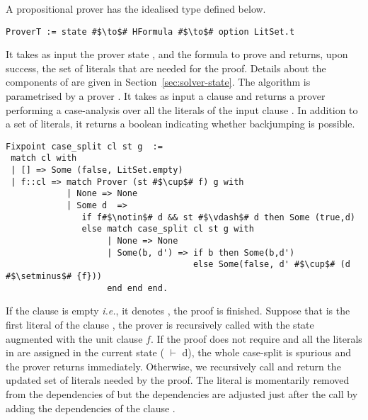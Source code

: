 \documentclass[utf8,a4paper,UKenglish,cleveref, autoref, thm-restate]{lipics-v2021}
\begin{document}
%
A propositional prover has the idealised type  defined below.
\begin{verbatim}
ProverT := state #$\to$# HFormula #$\to$# option LitSet.t
\end{verbatim}
It takes as input the prover state , and the formula
to prove  and returns, upon success, %
the set of literals that are needed for the proof.
%
Details about the components of  are given in Section~\ref{sec:solver-state}.
%
The  algorithm is parametrised by a prover .
It takes as input a clause  and returns a prover performing a case-analysis over all the
literals of the input clause . In addition to a set of
literals, it returns a boolean indicating whether backjumping is
possible.
\begin{verbatim}
Fixpoint case_split cl st g  :=
 match cl with
 | [] => Some (false, LitSet.empty)
 | f::cl => match Prover (st #$\cup$# f) g with
            | None => None
            | Some d  =>
               if f#$\notin$# d && st #$\vdash$# d then Some (true,d)
               else match case_split cl st g with
                    | None => None
                    | Some(b, d') => if b then Some(b,d')
                                     else Some(false, d' #$\cup$# (d #$\setminus$# {f}))
                    end end end.
\end{verbatim}
If the clause is empty \emph{i.e.}, it denotes , the proof
is finished.  Suppose that  is the first literal of the clause
, the prover is recursively called with the state 
augmented with the unit clause $f$. If the proof  does not
require  and all the literals in  are assigned in the current
state ( $\vdash$ d), the whole case-split is spurious and the
prover returns immediately.  Otherwise, we recursively call
 and return the updated set of literals needed by the proof.
%
The literal  is momentarily removed from the dependencies of
 but the dependencies are adjusted just after the
 call by adding the dependencies of the clause .
\end{document}
